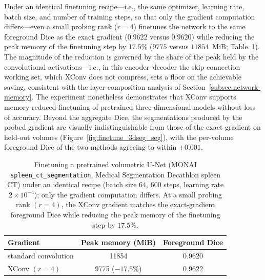 \documentclass[10pt]{article}
\begin{document}
Under an identical finetuning recipe---i.e., the same optimizer, learning rate, batch size, and number of training steps, so that only the gradient computation differs---even a small probing rank ($r{=}4$) finetunes the network to the same foreground Dice as the exact gradient ($0.9622$ versus $0.9620$) while reducing the peak memory of the finetuning step by $17.5\%$ ($9775$ versus $11854$~MiB; Table~\ref{tab:finetune_3dseg}). The magnitude of the reduction is governed by the share of the peak held by the convolutional activations---i.e., in this encoder--decoder the skip-connection working set, which XConv does not compress, sets a floor on the achievable saving, consistent with the layer-composition analysis of Section~\ref{subsec:network-memory}. The experiment nonetheless demonstrates that XConv supports memory-reduced finetuning of pretrained three-dimensional models without loss of accuracy. Beyond the aggregate Dice, the segmentations produced by the probed gradient are visually indistinguishable from those of the exact gradient on held-out volumes (Figure~\ref{fig:finetune_3dseg_seg}), with the per-volume foreground Dice of the two methods agreeing to within $\pm0.001$.

\begin{table}[t]
    \centering
    \begin{tabular}{lcc}
    \toprule
    \textbf{Gradient} & \textbf{Peak memory (MiB)} & \textbf{Foreground Dice} \\
    \midrule
    standard convolution & 11854 & 0.9620 \\
    XConv $(r{=}4)$ & 9775 \;($-17.5\%$) & 0.9622 \\
    \bottomrule
    \end{tabular}
    \caption{Finetuning a pretrained volumetric U-Net (MONAI \texttt{spleen\_ct\_segmentation}, Medical Segmentation Decathlon spleen CT) under an identical recipe (batch size $64$, $600$ steps, learning rate $2\times10^{-4}$); only the gradient computation differs. At a small probing rank $(r{=}4)$, the XConv gradient matches the exact-gradient foreground Dice while reducing the peak memory of the finetuning step by $17.5\%$.}
    \label{tab:finetune_3dseg}
\end{table}
\end{document}
